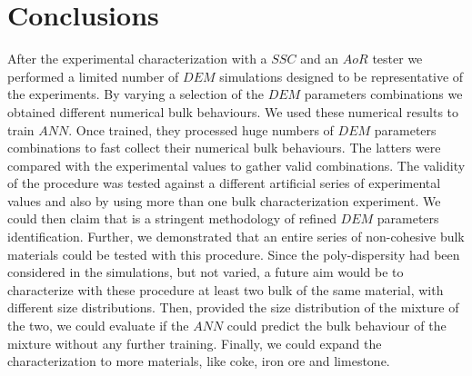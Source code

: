 \section{Conclusions}
\label{sec:conclusions}
After the experimental characterization with a $SSC$ and an $AoR$ tester we performed a 
limited number of $DEM$ simulations designed to be representative of the experiments. 
By varying a selection of the $DEM$ parameters combinations we obtained different numerical bulk behaviours. 
We used these numerical results to train $ANN$. Once trained, they processed huge 
numbers of $DEM$ parameters combinations to fast collect their numerical bulk behaviours. 
The latters were compared with the experimental values to gather valid combinations. 
The validity of the procedure was tested against a different artificial series of experimental 
values and also by using more than one bulk characterization experiment. 
We could then claim that is a stringent methodology of refined $DEM$ parameters identification. 
Further, we demonstrated that an entire series of non-cohesive bulk materials could be tested with this procedure.
Since the poly-dispersity had been considered in the simulations, but not varied, a future aim would 
be to characterize with these procedure at least two bulk of the same material, with different size distributions. 
Then, provided the size distribution of the mixture of the two, we could evaluate if the $ANN$ could predict 
the bulk behaviour of the mixture without any further training. 
Finally, we could expand the characterization to more materials, like coke, iron
ore and limestone.
